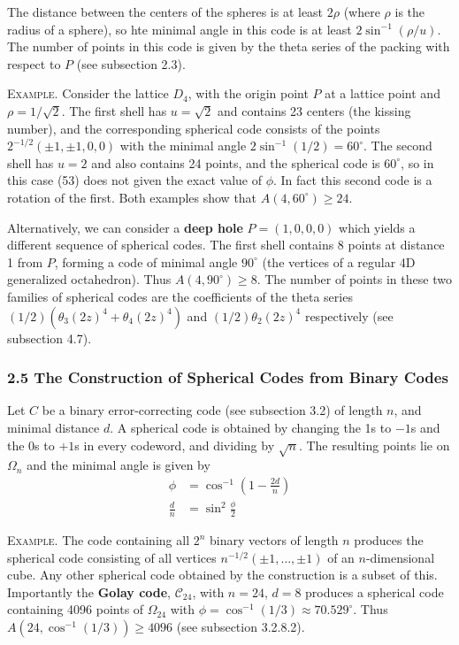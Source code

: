 \documentclass{article}
\renewcommand{\i}{^{-1}}
\newcommand{\degrees}{^\circ}
\newcommand{\ass}[1]{\left( #1 \right)}
\newcommand{\Golay}{\mathcal{C}_{24}}
\newcommand{\header}[1]{\vspace{1em}\noindent\textsc{#1.} }
\begin{document}
The distance between the centers of the spheres is at least $2 \rho$ (where $\rho$ is the radius of a sphere), so hte minimal angle in this code is at least $2 \sin\i(\rho / u)$. The number of points in this code is given by the theta series of the packing with respect to $P$ (see subsection 2.3).

\header{Example}
Consider the lattice $D_4$, with the origin point $P$ at a lattice point and $\rho = 1/\sqrt{2}$.
The first shell has $u = \sqrt 2$ and contains 23 centers (the kissing number), and the corresponding spherical code consists of the points $2^{-1/2} (\pm 1, \pm 1, 0, 0)$ with the minimal angle $2 \sin\i (1/2) = 60\degrees$.
The second shell has $u = 2$ and also contains 24 points, and the spherical code is $60\degrees$, so in this case (53) does not given the exact value of $\phi$. In fact this second code is a rotation of the first.
Both examples show that $A(4, 60\degrees) \geq 24$.

Alternatively, we can consider a \textbf{deep hole} $P = (1,0,0,0)$ which yields a different sequence of spherical codes.
The first shell contains 8 points at distance 1 from $P$, forming a code of minimal angle $90\degrees$ (the vertices of a regular 4D generalized octahedron).
Thus $A(4, 90\degrees) \geq 8$.
The number of points in these two families of spherical codes are the coefficients of the theta series
$(1/2)( \theta_3 (2z)^4 + \theta_4 (2z)^4 )$ and $(1/2) \theta_2 (2z)^4$ respectively (see subsection 4.7).

\subsubsection*{2.5 The Construction of Spherical Codes from Binary Codes}

Let $C$ be a binary error-correcting code (see subsection 3.2) of length $n$, and minimal distance $d$.
A spherical code is obtained by changing the 1s to $-1$s and the 0s to $+1$s in every codeword, and dividing by $\sqrt n$. The resulting points lie on $\Omega_n$ and the minimal angle is given by
\begin{align*}
  \phi &= \cos\i\ass{ 1 - \frac{2d}{n} } \\
  \frac{d}{n} &= \sin^2 \frac{\phi}{2}
\end{align*}

\header{Example}
The code containing all $2^n$ binary vectors of length $n$ produces the spherical code consisting of all vertices $n^{-1/2}(\pm 1, \dots, \pm 1)$ of an $n$-dimensional cube. Any other spherical code obtained by the construction is a subset of this.
Importantly the \textbf{Golay code}, $\Golay$, with $n = 24$, $d = 8$ produces a spherical code containing 4096 points of $\Omega_{24}$ with $\phi = \cos\i(1/3) \approx 70.529\degrees$. Thus $A(24, \cos\i(1/3)) \geq 4096$ (see subsection 3.2.8.2).
\end{document}
